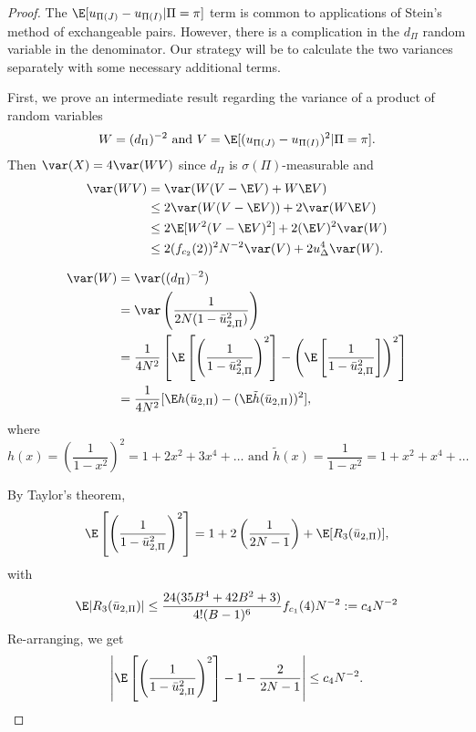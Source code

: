 \begin{proof}
  The $\E[u_{\Pi(J)}-u_{\Pi(I)} | \Pi = \pi]$ term is common to applications of Stein's method of
  exchangeable pairs.  However, there is a complication in the $d_{\Pi}$ random variable in the
  denominator.  Our strategy will be to calculate the two variances separately with some necessary
  additional terms.

  First, we prove an intermediate result regarding the variance of a product of random variables
  \begin{equation*}
    W = (d_{\Pi})^{-2} \text{ and } V = \E [(u_{\Pi(J)} - u_{\Pi(I)})^2 | \Pi = \pi].
  \end{equation*}
  Then $\var(X) = 4 \var(WV)$ since $d_{\Pi}$ is $\sigma(\Pi)$-measurable and 
  \begin{align}
    \label{E:var_prod}
    \var(WV) &= \var(W(V-\E V) + W \E V) \nonumber \\
    &\leq 2\var(W(V-\E V)) + 2 \var (W \E V) \nonumber \\
    &\leq 2 \E [W^2 (V-\E V)^2] + 2(\E V)^2 \var(W) \nonumber \\
    &\leq 2(f_{c_2}(2))^2 N^{-2} \var(V) + 2u_{\Delta}^4 \var(W).
  \end{align}

  \begin{align*}
    \var(W) &= \var ((d_{\Pi})^{-2}) \\
    &= \var \left ( \frac{1}{2N(1-\bar{u}_{2,\Pi}^2)} \right ) \\
    &= \frac{1}{4N^2} \left [ \E \left [ \left (\frac{1}{1-\bar{u}_{2,\Pi}^2}
        \right )^2 \right ] - 
      \left ( \E \left [ \frac{1}{1-\bar{u}_{2,\Pi}^2} \right ] \right )^2
    \right ] \\
    &= \frac{1}{4N^2}[\E h(\bar{u}_{2,\Pi}) - (\E \tilde{h}(\bar{u}_{2,\Pi}))^2],
  \end{align*}
  where 
  \begin{equation*}
    h(x) = \left ( \frac{1}{1-x^2} \right )^2 = 1 + 2x^2 + 3x^4 + \dots
      \text{ and } \tilde{h}(x) = \frac{1}{1-x^2} = 1 + x^2 + x^4 + \ldots
  \end{equation*}

  By Taylor's theorem,
  \begin{equation*}
    \E \left [ \left (\frac{1}{1-\bar{u}_{2,\Pi}^2} \right )^2 \right ] 
    = 1 + 2 \left ( \frac{1}{2N-1} \right ) + \E [R_3(\bar{u}_{2,\Pi})],
  \end{equation*}
  with
  \begin{equation*}
    \E |R_3(\bar{u}_{2,\Pi})| \leq \frac{24(35B^4 + 42 B^2 + 3)}{4!(B-1)^6}f_{c_1}(4) N^{-2}
    := c_4 N^{-2}
  \end{equation*}
  Re-arranging, we get
  \begin{equation*}
    \left | \E \left [ \left (\frac{1}{1-\bar{u}_{2,\Pi}^2} \right )^2 \right ] 
      - 1 - \frac{2}{2N-1} \right | \leq c_4 N^{-2}.
  \end{equation*}
  

\end{proof}
